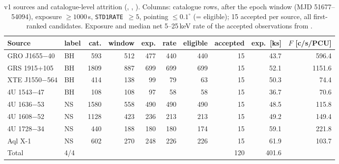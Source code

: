 \begin{table}[htbp]
\centering\small
\caption[v1 sources and attrition]{v1 sources and catalogue-level attrition (,
, ). Columns: catalogue rows, after the
epoch window (MJD 51677--54094), exposure $\ge1000$\,s, \texttt{STD1RATE}~$\ge5$, pointing $\le0.1^\circ$ (= eligible);
15 accepted per source, all first-ranked candidates. Exposure and median net 5--25\,keV rate of the accepted
observations from .}
\label{tab:p1sourcesv1}
\setlength{\tabcolsep}{4pt}\footnotesize
\begin{tabular}{@{}llrrrrrrrr@{}}
\toprule
Source & label & cat. & window & exp. & rate & eligible & accepted & exp.\ [ks] & $F$ [c/s/PCU] \\
\midrule
GRO J1655$-$40 & BH & 593 & 512 & 477 & 440 & 440 & 15 & 43.7 & 596.4 \\
GRS 1915+105 & BH & 1809 & 887 & 699 & 699 & 699 & 15 & 52.1 & 1151.6 \\
XTE J1550$-$564 & BH & 414 & 138 & 99 & 79 & 63 & 15 & 50.3 & 74.4 \\
4U 1543$-$47 & BH & 108 & 108 & 97 & 58 & 58 & 15 & 36.7 & 70.6 \\
4U 1636$-$53 & NS & 1580 & 558 & 490 & 490 & 490 & 15 & 48.5 & 115.8 \\
4U 1608$-$52 & NS & 1128 & 423 & 236 & 213 & 213 & 15 & 49.2 & 149.4 \\
4U 1728$-$34 & NS & 440 & 188 & 180 & 180 & 174 & 15 & 59.1 & 221.8 \\
Aql X-1 & NS & 602 & 270 & 248 & 226 & 226 & 15 & 61.9 & 103.7 \\
\midrule
Total & 4/4 & & & & & & 120 & 401.6 & \\
\bottomrule
\end{tabular}
\end{table}


